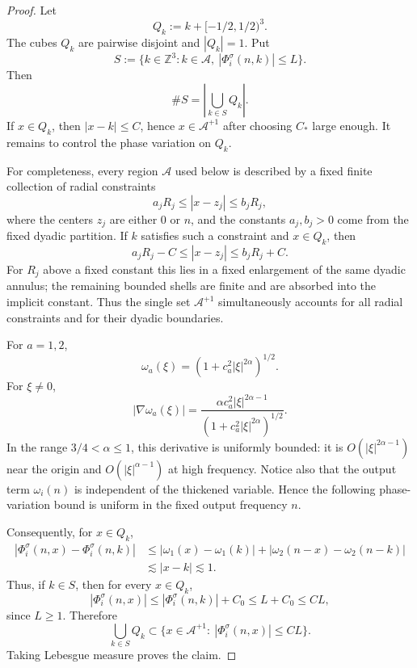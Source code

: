 \documentclass[10pt]{amsart}
\numberwithin{equation}{section}
\theoremstyle{plain}
\theoremstyle{definition}
\theoremstyle{remark}
\newcommand{\Z}{\mathbb{Z}}
\begin{document}
\begin{proof}
Let
\[
        Q_k:=k+[-1/2,1/2)^3.
\]
The cubes \(Q_k\) are pairwise disjoint and \(|Q_k|=1\).  Put
\[
        S:=\{k\in\Z^3:k\in\mathcal A,\ |\Phi_i^\sigma(n,k)|\le L\}.
\]
Then
\[
        \#S=\left|\bigcup_{k\in S}Q_k\right|.
\]
If \(x\in Q_k\), then \(|x-k|\le C\), hence \(x\in\mathcal A^{+1}\) after choosing \(C_*\) large enough.  It remains to control the phase variation on \(Q_k\).

For completeness, every region \(\mathcal A\) used below is described by a fixed finite collection of radial constraints
\[
        a_jR_j\le |x-z_j|\le b_jR_j,
\]
where the centers \(z_j\) are either \(0\) or \(n\), and the constants \(a_j,b_j>0\) come from the fixed dyadic partition.  If \(k\) satisfies such a constraint and \(x\in Q_k\), then
\[
        a_jR_j-C\le |x-z_j|\le b_jR_j+C.
\]
For \(R_j\) above a fixed constant this lies in a fixed enlargement of the same dyadic annulus; the remaining bounded shells are finite and are absorbed into the implicit constant.  Thus the single set \(\mathcal A^{+1}\) simultaneously accounts for all radial constraints and for their dyadic boundaries.

For \(a=1,2\),
\[
        \omega_a(\xi)=(1+c_a^2|\xi|^{2\alpha})^{1/2}.
\]
For \(\xi\ne0\),
\[
        |\nabla\omega_a(\xi)|
        =
        \frac{\alpha c_a^2|\xi|^{2\alpha-1}}
             {(1+c_a^2|\xi|^{2\alpha})^{1/2}}.
\]
In the range \(3/4<\alpha\le1\), this derivative is uniformly bounded: it is \(O(|\xi|^{2\alpha-1})\) near the origin and \(O(|\xi|^{\alpha-1})\) at high frequency.  Notice also that the output term \(\omega_i(n)\) is independent of the thickened variable.  Hence the following phase-variation bound is uniform in the fixed output frequency \(n\).

Consequently, for \(x\in Q_k\),
\[
\begin{aligned}
        |\Phi_i^\sigma(n,x)-\Phi_i^\sigma(n,k)|
        &\le
        |\omega_1(x)-\omega_1(k)|
        +|\omega_2(n-x)-\omega_2(n-k)| \\
        &\lesssim |x-k|\lesssim1.
\end{aligned}
\]
Thus, if \(k\in S\), then for every \(x\in Q_k\),
\[
        |\Phi_i^\sigma(n,x)|\le |\Phi_i^\sigma(n,k)|+C_0\le L+C_0\le CL,
\]
since \(L\ge1\).  Therefore
\[
        \bigcup_{k\in S}Q_k
        \subset
        \{x\in\mathcal A^{+1}:\ |\Phi_i^\sigma(n,x)|\le CL\}.
\]
Taking Lebesgue measure proves the claim.
\end{proof}
\end{document}
